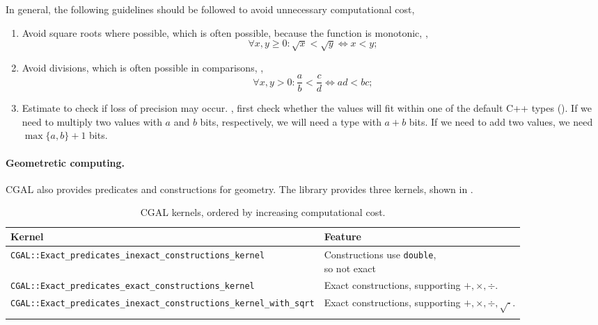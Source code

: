 \documentclass[justified,nobib]{tufte-handout}
\begin{document}
In general, the following guidelines should be followed to avoid unnecessary
computational cost,
\begin{enumerate}
  \item Avoid square roots where possible, which is often possible, because the
    function is monotonic, \ie, \[
      \forall x,y \geq 0 : \sqrt{x} < \sqrt{y} \iff x < y
    ;\]
  \item Avoid divisions, which is often possible in comparisons,
    \ie, \[
      \forall x,y > 0 : \frac{a}{b} < \frac{c}{d} \iff ad < bc
    ;\]
  \item Estimate to check if loss of precision may occur. \Ie, first check
    whether the values will fit within one of the default C++ types
    (). If we need to multiply two values with $a$ and $b$
    bits, respectively, we will need a type with $a+b$ bits. If we need to add
    two values, we need $\max\{a,b\}+1$ bits.
\end{enumerate}

\paragraph{Geometretic computing.}

CGAL also provides predicates and constructions for geometry. The library
provides three kernels, shown in .

\begin{table*}[h]
  \centering
  \caption{CGAL kernels, ordered by increasing computational cost.}
  \label{tab:cgal-kernels}
  \begin{tabular}{ll} \toprule
    Kernel & Feature \\
    \midrule
    \texttt{CGAL::Exact\_predicates\_inexact\_constructions\_kernel} & \makecell[l]{Constructions use \texttt{double},\\so not exact} \\
    \texttt{CGAL::Exact\_predicates\_exact\_constructions\_kernel} & \makecell[l]{Exact constructions,\\supporting $+,\times,\div$.} \\
    \texttt{CGAL::Exact\_predicates\_inexact\_constructions\_kernel\_with\_sqrt} & \makecell[l]{Exact constructions,\\supporting $+,\times,\div,\sqrt{\cdot}$.} \\
    \bottomrule \\
  \end{tabular}
\end{table*}
\end{document}
